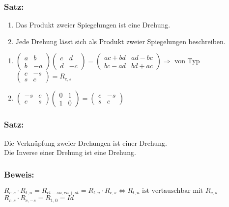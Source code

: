\subsubsection{Satz:}
\begin{enumerate}
	\item Das Produkt zweier Spiegelungen ist eine Drehung.
	\item Jede Drehung lässt sich als Produkt zweier Spiegelungen beschreiben.
\end{enumerate}
\begin{enumerate}
	\item $ \begin{pmatrix} a & b \\ b & -a \end{pmatrix}  \begin{pmatrix} c & d \\ d & -c \end{pmatrix} = \begin{pmatrix} ac+bd & ad-bc \\ bc-ad & bd+ac \end{pmatrix} \Rightarrow$ von Typ $ \begin{pmatrix} c & -s \\ s & c \end{pmatrix} = R_{c,s}$
	\item $\begin{pmatrix} -s & c \\ c & s \end{pmatrix} \begin{pmatrix} 0 & 1 \\ 1 & 0 \end{pmatrix} = \begin{pmatrix} c  & -s \\ s & c \end{pmatrix}$
\end{enumerate}
%
%
%
\subsubsection{Satz:}
Die Verknüpfung zweier Drehungen ist einer Drehung. \\
Die Inverse einer Drehung ist eine Drehung. 
%
%
%
%
\subsubsection{Beweis:}
$R_{c,s} \cdot R_{t,u}=R_{ct-su,cu+st}=R_{t,u} \cdot R_{c,s} \Leftrightarrow R_{t,u}\textrm{ ist vertauschbar mit } R_{c,s}$ \\
$R_{c,s}\cdot R_{c,-s} = R_{1,0} = Id$\\
%
%
%
